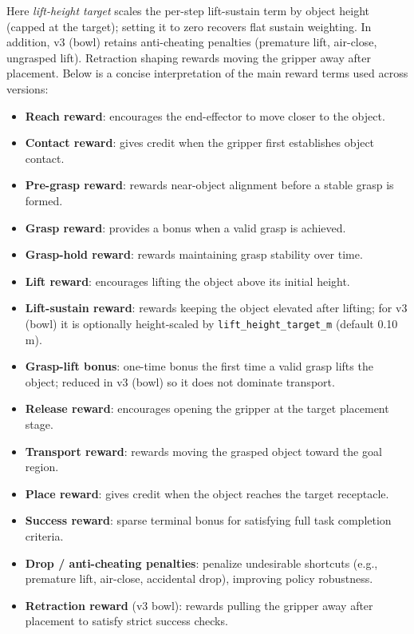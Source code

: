 \documentclass[11pt,a4paper]{article}
\begin{document}
\noindent Here \emph{lift-height target} scales the per-step lift-sustain term by object height (capped at the target); setting it to zero recovers flat sustain weighting. In addition, v3 (bowl) retains anti-cheating penalties (premature lift, air-close, ungrasped lift). Retraction shaping rewards moving the gripper away after placement. Below is a concise interpretation of the main reward terms used across versions:
\begin{itemize}
    \item \textbf{Reach reward}: encourages the end-effector to move closer to the object.
    \item \textbf{Contact reward}: gives credit when the gripper first establishes object contact.
    \item \textbf{Pre-grasp reward}: rewards near-object alignment before a stable grasp is formed.
    \item \textbf{Grasp reward}: provides a bonus when a valid grasp is achieved.
    \item \textbf{Grasp-hold reward}: rewards maintaining grasp stability over time.
    \item \textbf{Lift reward}: encourages lifting the object above its initial height.
    \item \textbf{Lift-sustain reward}: rewards keeping the object elevated after lifting; for v3 (bowl) it is optionally height-scaled by \texttt{lift\_height\_target\_m} (default 0.10\,m).
    \item \textbf{Grasp-lift bonus}: one-time bonus the first time a valid grasp lifts the object; reduced in v3 (bowl) so it does not dominate transport.
    \item \textbf{Release reward}: encourages opening the gripper at the target placement stage.
    \item \textbf{Transport reward}: rewards moving the grasped object toward the goal region.
    \item \textbf{Place reward}: gives credit when the object reaches the target receptacle.
    \item \textbf{Success reward}: sparse terminal bonus for satisfying full task completion criteria.
    \item \textbf{Drop / anti-cheating penalties}: penalize undesirable shortcuts (e.g., premature lift, air-close, accidental drop), improving policy robustness.
    \item \textbf{Retraction reward} (v3 bowl): rewards pulling the gripper away after placement to satisfy strict success checks.
\end{itemize}
\end{document}
